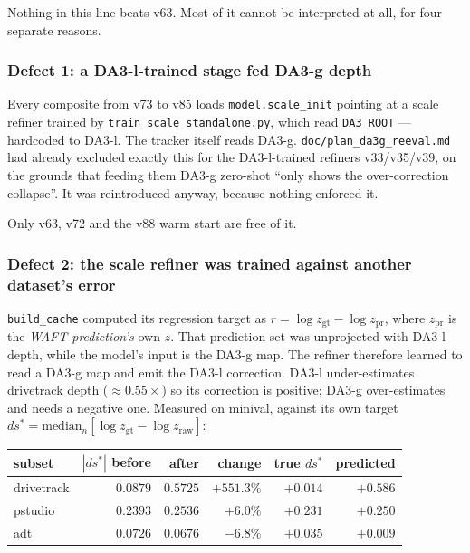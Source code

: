 \documentclass[11pt,a4paper]{article}
\begin{document}
Nothing in this line beats v63. Most of it cannot be interpreted at all, for four separate reasons.

\subsubsection{Defect 1: a DA3-l-trained stage fed DA3-g depth}
\label{sec:dsr-contam}

Every composite from v73 to v85 loads \texttt{model.scale\_init} pointing at a scale refiner trained
by \texttt{train\_scale\_standalone.py}, which read \texttt{DA3\_ROOT} --- hardcoded to DA3-l. The
tracker itself reads DA3-g. \texttt{doc/plan\_da3g\_reeval.md} had already excluded exactly this for
the DA3-l-trained refiners v33/v35/v39, on the grounds that feeding them DA3-g zero-shot ``only
shows the over-correction collapse''. It was reintroduced anyway, because nothing enforced it.

Only v63, v72 and the v88 warm start are free of it.

\subsubsection{Defect 2: the scale refiner was trained against another dataset's error}
\label{sec:dsr-target}

\texttt{build\_cache} computed its regression target as
$r=\log z_{\mathrm{gt}}-\log z_{\mathrm{pr}}$, where $z_{\mathrm{pr}}$ is the \emph{WAFT
prediction's} own $z$. That prediction set was unprojected with DA3-l depth, while the model's input
is the DA3-g map. The refiner therefore learned to read a DA3-g map and emit the DA3-l correction.
DA3-l under-estimates drivetrack depth ($\approx 0.55\times$) so its correction is positive; DA3-g
over-estimates and needs a negative one. Measured on minival, against its own target
$ds^{*}=\mathrm{median}_n[\log z_{\mathrm{gt}}-\log z_{\mathrm{raw}}]$:

\begin{center}\small
\begin{tabular}{lrrrrr}
\toprule
subset & $|ds^{*}|$ before & after & change & true $ds^{*}$ & predicted \\
\midrule
drivetrack & $0.0879$ & $0.5725$ & $+551.3\%$ & $+0.014$ & $+0.586$ \\
pstudio    & $0.2393$ & $0.2536$ & $+6.0\%$   & $+0.231$ & $+0.250$ \\
adt        & $0.0726$ & $0.0676$ & $-6.8\%$   & $+0.035$ & $+0.009$ \\
\bottomrule
\end{tabular}
\end{center}
\end{document}
